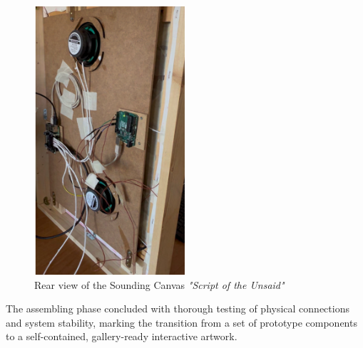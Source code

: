 \documentclass{article}
\begin{document}
\begin{figure}[h]
	\centering
	\includegraphics[height=10cm]{./images/assembled}
	\caption{Rear view of the Sounding Canvas \emph{"Script of the Unsaid"}}
	\label{fig:assembled}
\end{figure}
\noindent
The assembling phase concluded with thorough testing of physical connections and system stability, marking the transition from a set of prototype components to a self-contained, gallery-ready interactive artwork.
\end{document}
